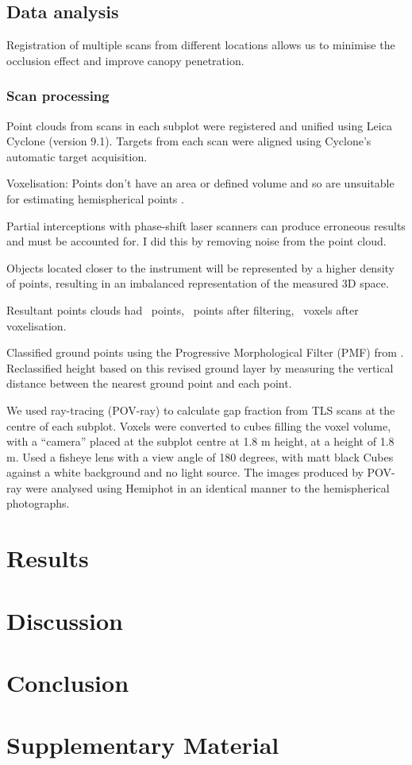 \documentclass[11pt,a4paper]{article}
\newcommand{\beginsupplement}{%
	\setcounter{table}{0}
	\renewcommand{\thetable}{S\arabic{table}}%
	\setcounter{figure}{0}
	\renewcommand{\thefigure}{S\arabic{figure}}%
}
\begin{document}
\subsection{Data analysis}

Registration of multiple scans from different locations allows us to minimise the occlusion effect and improve canopy penetration.

\subsubsection{Scan processing}

Point clouds from scans in each subplot were registered and unified using Leica Cyclone (version 9.1). Targets from each scan were aligned using Cyclone's automatic target acquisition. 

Voxelisation: Points don't have an area or defined volume and so are unsuitable for estimating hemispherical points \citep{Seidel2012}.

Partial interceptions with phase-shift laser scanners can produce erroneous results and must be accounted for. I did this by removing noise from the point cloud.


Objects located closer to the instrument will be represented by a higher density of points, resulting in an imbalanced representation of the measured 3D space.

Resultant points clouds had ~points, ~points after filtering, ~voxels after voxelisation.

Classified ground points using the Progressive Morphological Filter (PMF) from \citep{Zhang2003}. Reclassified height based on this revised ground layer by measuring the vertical distance between the nearest ground point and each point.

We used ray-tracing (POV-ray) to calculate gap fraction from TLS scans at the centre of each subplot. Voxels were converted to cubes filling the voxel volume, with a ``camera'' placed at the subplot centre at 1.8 m height, at a height of 1.8 m. Used a fisheye lens with a view angle of 180 degrees, with matt black Cubes against a white background and no light source. The images produced by POV-ray were analysed using Hemiphot in an identical manner to the hemispherical photographs.

\section{Results}

\section{Discussion}

\section{Conclusion}

\printbibliography

\section{Supplementary Material} \beginsupplement
\end{document}
